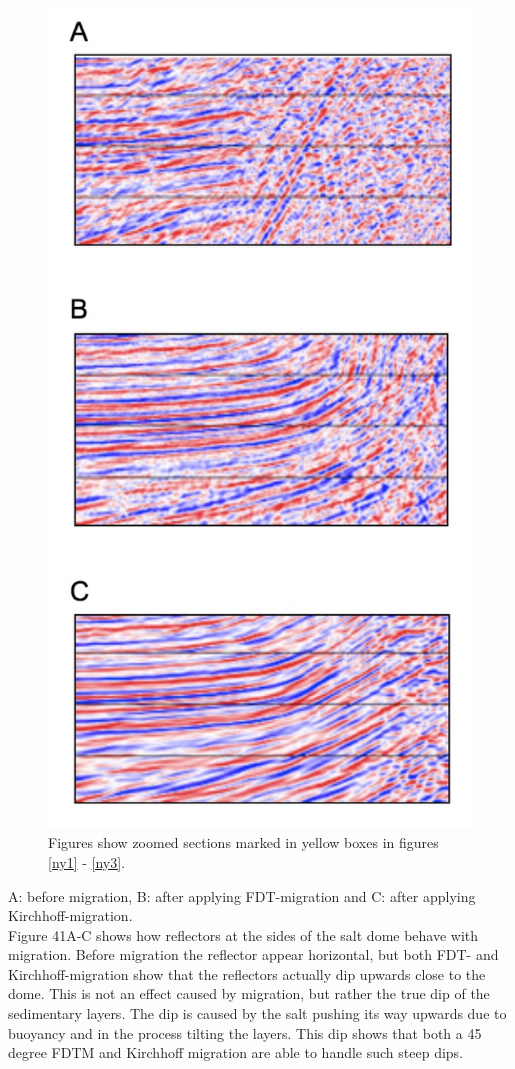 \documentclass[10pt,a4paper]{article}
\begin{document}
\begin{figure}[H]
\includegraphics[scale=0.4]{ny6.jpg}
\caption{Figures show zoomed sections marked in yellow boxes in figures \ref{ny1} - \ref{ny3}.}
\label{ny6}
\end{figure}

\noindent A: before migration, B: after applying FDT-migration and C: after applying Kirchhoff-migration. 
\\
Figure 41A-C shows how reflectors at the sides of the salt dome behave with migration. Before migration the reflector appear horizontal, but both FDT- and Kirchhoff-migration show that the reflectors actually dip upwards close to the dome. This is not an effect caused by migration, but rather the true dip of the sedimentary layers. The dip is caused by the salt pushing its way upwards due to buoyancy and in the process tilting the layers. This dip shows that both a 45 degree FDTM and Kirchhoff migration are able to handle such steep dips. 
\end{document}
